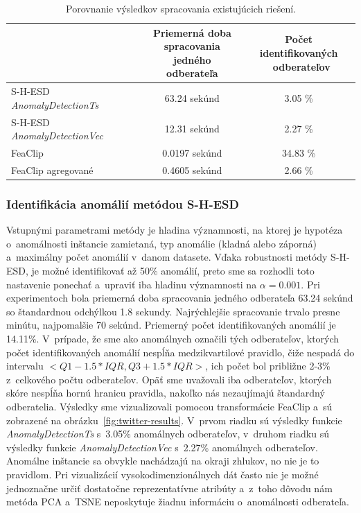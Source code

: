 \documentclass[a4paper,twoside,slovak,12pt,appendix]{article}
\begin{document}
\begin{table}[ht]
  \centering
  \caption{Porovnanie výsledkov spracovania existujúcich riešení.}
  \label{tab:existing-solutions}
  \begin{tabular}{|l|c|c|}
    \hline
    &   \shortstack{\textbf{Priemerná doba} \\ \textbf{spracovania jedného} \\  \textbf{odberateľa}}  &   \shortstack{\textbf{Počet identifikovaných} \\ \textbf{odberateľov}}  \\ \hline
    S-H-ESD \textit{AnomalyDetectionTs}     &   63.24 sekúnd                      &       3.05 \%        \\ \hline
    S-H-ESD \textit{AnomalyDetectionVec}    &   12.31 sekúnd                      &       2.27 \%        \\ \hline
    FeaClip                                 &   0.0197 sekúnd                     &       34.83 \%       \\ \hline
    FeaClip agregované                      &   0.4605 sekúnd                     &       2.66 \%        \\ \hline
  \end{tabular}
\end{table}

\subsubsection{Identifikácia anomálií metódou S-H-ESD}
Vstupnými parametrami metódy je hladina významnosti, na ktorej je hypotéza
o~anomálnosti inštancie zamietaná, typ anomálie (kladná alebo záporná)
a~maximálny počet anomálií v~danom datasete. Vďaka robustnosti metódy S-H-ESD,
je možné identifikovať až 50\% anomálií, preto sme sa rozhodli toto nastavenie
ponechať a~upraviť iba hladinu významnosti na $\alpha = 0.001$. Pri
experimentoch bola priemerná doba spracovania jedného odberateľa 63.24 sekúnd so
štandardnou odchýlkou 1.8 sekundy. Najrýchlejšie spracovanie trvalo presne
minútu, najpomalšie 70 sekúnd. Priemerný počet identifikovaných anomálií je
14.11\%. V~prípade, že sme ako anomálnych označili tých odberateľov, ktorých
počet identifikovaných anomálií nespĺňa medzikvartilové pravidlo, čiže nespadá
do intervalu $<Q1 - 1.5 * IQR, Q3 + 1.5 * IQR>$, ich počet bol približne 2-3\%
z~celkového počtu odberateľov. Opäť sme uvažovali iba odberateľov, ktorých skóre
nespĺňa hornú hranicu pravidla, nakoľko nás nezaujímajú štandardný odberatelia.
Výsledky sme vizualizovali pomocou transformácie FeaClip a~sú zobrazené na
obrázku~\ref{fig:twitter-results}. V~prvom riadku sú výsledky funkcie
\textit{AnomalyDetectionTs} s~3.05\% anomálnych odberateľov, v~druhom riadku sú
výsledky funkcie \textit{AnomalyDetectionVec} s~2.27\% anomálnych odberateľov.
Anomálne inštancie sa obvykle nachádzajú na okraji zhlukov, no nie je to
pravidlom. Pri vizualizácií vysokodimenzionálnych dát často nie je možné
jednoznačne určiť dostatočne reprezentatívne atribúty a~z~toho dôvodu nám metóda
PCA a~TSNE neposkytuje žiadnu informáciu o~anomálnosti odberateľa.
\end{document}
